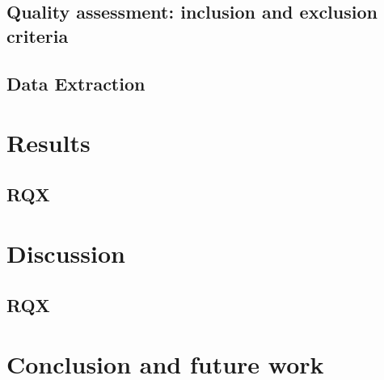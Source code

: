\documentclass[conference]{IEEEtran}
\begin{document}
\subsection{Quality assessment: inclusion and exclusion criteria}

\subsection{Data Extraction}

\section{Results}
\label{sec:res}

\subsection{RQX}

\section{Discussion}
\label{sec:disc}

\subsection{RQX}

\section{Conclusion and future work}
\label{sec:conc}



\end{document}
